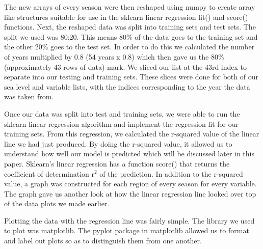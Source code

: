 \documentclass[12pt]{report}
\begin{document}
\par The new arrays of every season were then reshaped using numpy to create array like structures suitable for use in the sklearn linear regression fit() and score() functions. Next, the reshaped data was split into training sets and test sets. The split we used was 80:20. This means 80\% of the data goes to the training set and the other 20\% goes to the test set. In order to do this we calculated the number of years multiplied by 0.8 (54 years x 0.8) which then gave us the 80\% (approximately 43 rows of data) mark. We sliced our list at the 43rd index to separate into our testing and training sets. These slices were done for both of our sea level and variable lists, with the indices corresponding to the year the data was taken from.
\par Once our data was split into test and training sets, we were able to run the sklearn linear regression algorithm and implement the regression fit for our training sets. From this regression, we calculated the r-squared value of the linear line we had just produced. By doing the r-squared value, it allowed us to understand how well our model is predicted which will be discussed later in this paper. Sklearn’s linear regression has a function score() that returns the coefficient of determination r$^2$ of the prediction. In addition to the r-squared value, a graph was constructed for each region of every season for every variable. The graph gave us another look at how the linear regression line looked over top of the data plots we made earlier. 
\par Plotting the data with the regression line was fairly simple. The library we used to plot was matplotlib. The pyplot package in matplotlib allowed us to format and label out plots so as to distinguish them from one another.
\end{document}
